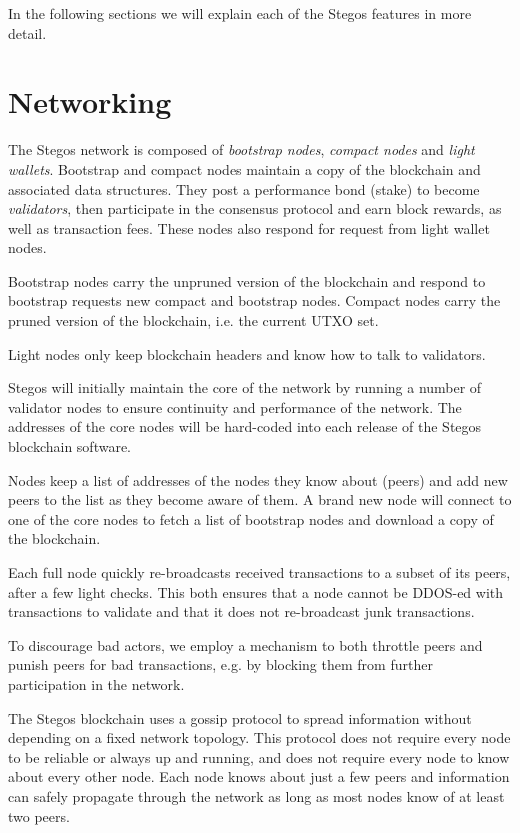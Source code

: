 \documentclass[a4paper, 10pt, conference]{ieeeconf}
\begin{document}
In the following sections we will explain each of the Stegos features in more detail.

\section{Networking}\label{Networking}

The Stegos network is composed of \textit{bootstrap nodes}, \textit{compact nodes} and \textit{light wallets}. Bootstrap and compact nodes maintain a copy of the blockchain and associated data structures. They post a performance bond (stake) to become \textit{validators}, then participate in the consensus protocol and earn block rewards, as well as transaction fees. These nodes also respond for request from light wallet nodes.

Bootstrap nodes carry the unpruned version of the blockchain and respond to bootstrap requests new compact and bootstrap nodes. Compact nodes carry the pruned version of the blockchain, i.e. the current UTXO set.

Light nodes only keep blockchain headers and know how to talk to validators. 

Stegos will initially maintain the core of the network by running a number of validator nodes to ensure continuity and performance of the network. The addresses of the core nodes will be hard-coded into each release of the Stegos blockchain software.

Nodes keep a list of addresses of the nodes they know about (peers) and add new peers to the list as they become aware of them. A brand new node will connect to one of the core nodes to fetch a list of bootstrap nodes and download a copy of the blockchain. 

Each full node quickly re-broadcasts received transactions to a subset of its peers, after a few  light checks. This both ensures that a node cannot be DDOS-ed with transactions to validate and that it does not re-broadcast junk transactions.

To discourage bad actors, we employ a mechanism to both throttle peers and punish peers for bad transactions, e.g. by blocking them from further participation in the network.

The Stegos blockchain uses a gossip protocol to spread information without depending on a fixed network topology. This protocol does not require every node to be reliable or always up and running, and does not require every node to know about every other node. Each node knows about just a few peers and information can safely propagate through the network as long as most nodes know of at least two peers.
\end{document}
